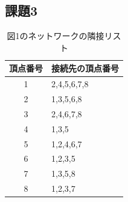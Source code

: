 \documentclass[12pt]{jarticle}
\begin{document}
\subsection{課題3}
\begin{table}[htb]
    \caption{図1のネットワークの隣接リスト}
    \begin{center}
        \begin{tabular}{|c|l|}
            \hline
            頂点番号 & 接続先の頂点番号 \\ \hline \hline
            1        & 2,4,5,6,7,8      \\ \hline
            2        & 1,3,5,6,8        \\ \hline
            3        & 2,4,6,7,8        \\ \hline
            4        & 1,3,5            \\ \hline
            5        & 1,2,4,6,7        \\ \hline
            6        & 1,2,3,5          \\ \hline
            7        & 1,3,5,8          \\ \hline
            8        & 1,2,3,7          \\ \hline
        \end{tabular}
    \end{center}
\end{table}

\clearpage
\end{document}
